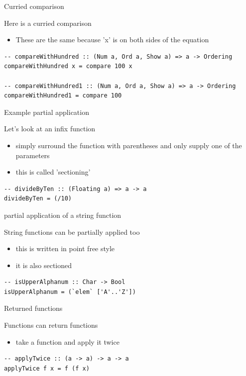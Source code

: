 \documentclass[presetation]{beamer}
\begin{document}
\begin{frame}[fragile,label={sec:org6a23767}]{Curried comparison}
 \begin{block}{Here is a curried comparison}
\begin{itemize}
\item These are the same because 'x' is on both sides of the equation
\end{itemize}
\begin{verbatim}
-- compareWithHundred :: (Num a, Ord a, Show a) => a -> Ordering  
compareWithHundred x = compare 100 x  

-- compareWithHundred1 :: (Num a, Ord a, Show a) => a -> Ordering  
compareWithHundred1 = compare 100  
\end{verbatim}
\end{block}
\end{frame}

\begin{frame}[fragile,label={sec:org48ecbb3}]{Example partial application}
 \begin{block}{Let's look at an infix function}
\begin{itemize}
\item simply surround the function with parentheses and only supply one of
the parameters
\item this is called 'sectioning'
\end{itemize}
\begin{verbatim}
-- divideByTen :: (Floating a) => a -> a
divideByTen = (/10)
\end{verbatim}
\end{block}
\end{frame}

\begin{frame}[fragile,label={sec:orgdd88770}]{partial application of a string function}
 \begin{block}{String functions can be partially applied too}
\begin{itemize}
\item this is written in point free style
\item it is also sectioned
\end{itemize}
\begin{verbatim}
-- isUpperAlphanum :: Char -> Bool
isUpperAlphanum = (`elem` ['A'..'Z'])
\end{verbatim}
\end{block}
\end{frame}


\begin{frame}[fragile,label={sec:org603b216}]{Returned functions}
 \begin{block}{Functions can return functions}
\begin{itemize}
\item take a function and apply it twice
\end{itemize}
\begin{verbatim}
-- applyTwice :: (a -> a) -> a -> a
applyTwice f x = f (f x)
\end{verbatim}
\end{block}
\end{frame}
\end{document}
